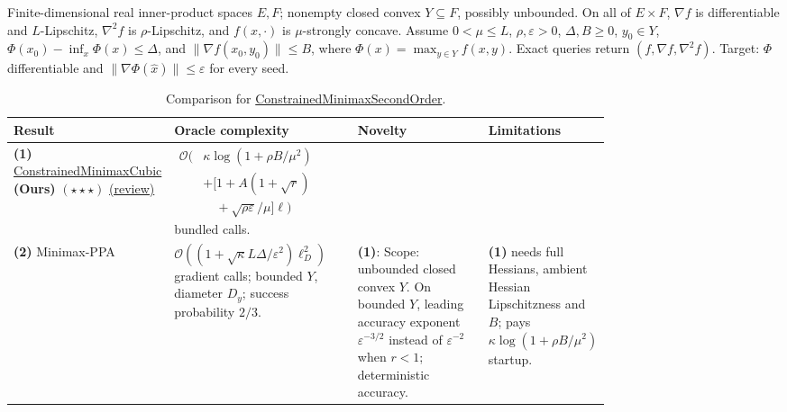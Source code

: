 \begin{table}[tp]
\centering
\caption{Comparison for \href{https://github.com/k3nfalt/longtails/blob/main/LongTails/Setups/ConstrainedMinimaxSecondOrder.lean}{ConstrainedMinimaxSecondOrder}.}\label{tab:ConstrainedMinimaxSecondOrder}
\parbox{\linewidth}{\footnotesize Finite-dimensional real inner-product spaces $E,F$; nonempty closed convex $Y\subseteq F$, possibly unbounded. On all of $E\times F$, $\nabla f$ is differentiable and $L$-Lipschitz, $\nabla^2 f$ is $\rho$-Lipschitz, and $f(x,\cdot)$ is $\mu$-strongly concave. Assume $0<\mu\le L$, $\rho,\varepsilon>0$, $\Delta,B\ge0$, $y_0\in Y$, $\Phi(x_0)-\inf_x\Phi(x)\le\Delta$, and $\|\nabla f(x_0,y_0)\|\le B$, where $\Phi(x)=\max_{y\in Y}f(x,y)$. Exact queries return $(f,\nabla f,\nabla^2 f)$. Target: $\Phi$ differentiable and $\|\nabla\Phi(\hat x)\|\le\varepsilon$ for every seed.}\par\smallskip
\begin{threeparttable}
\footnotesize
\setlength{\tabcolsep}{4pt}\renewcommand{\arraystretch}{1.25}
\begin{tabularx}{\linewidth}{@{}>{\raggedright\arraybackslash}p{0.20\linewidth}>{\raggedright\arraybackslash}p{0.32\linewidth}>{\raggedright\arraybackslash}p{0.25\linewidth}>{\raggedright\arraybackslash}X@{}}
\toprule
\textbf{Result} & \textbf{Oracle complexity} & \textbf{Novelty} & \textbf{Limitations} \\
\midrule
\textbf{(1)} \href{https://github.com/k3nfalt/longtails/blob/main/LongTails/Theorems/ConstrainedMinimaxCubic.lean}{Constrained\allowbreak Minimax\allowbreak Cubic} \textbf{(Ours)} $(\star\star\star)$ \href{https://github.com/k3nfalt/longtails/blob/main/scripts/reviews/ConstrainedMinimaxCubic.md}{(review)} &
$\begin{aligned}\mathcal{O}\bigl(&\kappa\log(1+\rho B/\mu^2)\\&+[1+A(1+\sqrt r)\\&\quad+\sqrt{\rho\varepsilon}/\mu]\ell\bigr)\end{aligned}$ bundled calls. & & \\
\midrule[1.2pt]
\textbf{(2)} Minimax-PPA \citep[Theorem 20]{cmsLin2020} &
$\mathcal{O}\!\left((1+\sqrt\kappa L\Delta/\varepsilon^2)\ell_D^2\right)$ gradient calls; bounded $Y$, diameter $D_y$; success probability $2/3$. &
\textbf{(1)}: Scope: unbounded closed convex $Y$. On bounded $Y$, leading accuracy exponent $\varepsilon^{-3/2}$ instead of $\varepsilon^{-2}$ when $r<1$; deterministic accuracy. &
\textbf{(1)} needs full Hessians, ambient Hessian Lipschitzness and $B$; pays $\kappa\log(1+\rho B/\mu^2)$ startup. \\

\end{tabularx}
\end{threeparttable}
\end{table}
